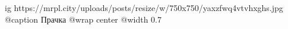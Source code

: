  
 
 
 
 

\ifcmt
  ig https://mrpl.city/uploads/posts/resize/w/750x750/yaxzfwq4vtvhxghs.jpg
	@caption Прачка
  @wrap center
  @width 0.7
\fi
